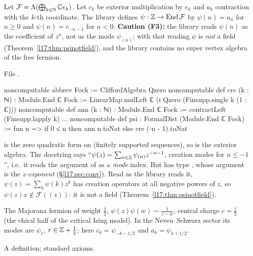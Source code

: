 \begin{definition}\label{l17:def:psi}
Let $\mathcal F=\Lambda(\bigoplus_{k\in{\mathbb{N}}}{\mathbb{C}} e_k)$. Let $c_k$ be exterior multiplication by $e_k$ and
$a_k$ contraction with the $k$-th coordinate. The library defines $\psi:{\mathbb{Z}}\to\operatorname{End}\mathcal F$ by
$\psi(n)=a_n$ for $n\ge0$ and $\psi(n)=c_{-n-1}$ for $n<0$. \textbf{Caution (F3):} the library
reads $\psi(n)$ as the coefficient of $z^{n}$, not as the mode $\psi_{(n)}$; with that reading $\psi$ is
\emph{not} a field (Theorem~\ref{l17:thm:psinotfield}), and the library contains no super vertex
algebra of the free fermion.
\end{definition}
\noindent File .
\begin{leancode}
noncomputable abbrev Fock := CliffordAlgebra Qzero
noncomputable def cre (k : ℕ) : Module.End ℂ Fock :=
  LinearMap.mulLeft ℂ (ι Qzero (Finsupp.single k (1 : ℂ)))
noncomputable def ann (k : ℕ) : Module.End ℂ Fock := contractLeft (Finsupp.lapply k)
...
noncomputable def psi : FormalDist (Module.End ℂ Fock) :=
  fun n => if 0 ≤ n then ann n.toNat else cre (-n - 1).toNat
\end{leancode}
\begin{dictionary}
 is the zero quadratic form on  (finitely supported sequences),
so  is the exterior algebra. The docstring says ``$\psi(z)=\sum_{n\in{\mathbb{Z}}}\psi_{(n)}z^{-n-1}$,
creation modes for $n\le-1$'', i.e.\ it reads the argument of  as a \emph{mode} index. But
 has type , whose argument is the \emph{$z$-exponent}
(§\ref{l17:sec:conv}). Read as the library reads it, $\psi(z)=\sum_k\psi(k)z^k$ has creation
operators at all negative powers of $z$, so $\psi(z)x\notin\mathcal F((z))$: it is not a field
(Theorem~\ref{l17:thm:psinotfield}).
\end{dictionary}
\begin{physics}
The Majorana fermion of weight $\frac12$, $\psi(z)\psi(w)\sim\frac1{z-w}$, central charge
$c=\frac12$ (the chiral half of the critical Ising model). In the Neveu--Schwarz sector its modes are
$\psi_r$, $r\in{\mathbb{Z}}+\frac12$; here $c_k=\psi_{-k-1/2}$ and $a_k=\psi_{k+1/2}$.
\end{physics}
\begin{status}
A definition; standard axioms.
\end{status}

